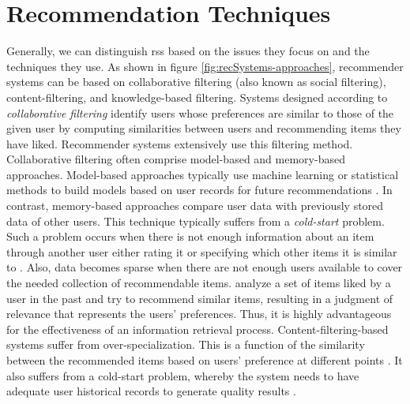\section{Recommendation Techniques}
Generally, we can distinguish \Glspl{rs}  based on the issues they focus on and the techniques they use. As shown in figure \ref{fig:recSystems-approaches}, recommender systems can be based on collaborative filtering (also known as social filtering), content-filtering, and knowledge-based filtering.
Systems designed according to \textit{collaborative filtering} identify users whose preferences are similar to those of the given user by computing similarities between users and recommending items they have liked\parencite{Balabanovic1997Content-BasedRecommendation}. Recommender systems extensively use this filtering method. Collaborative filtering often comprise model-based and memory-based approaches. Model-based approaches typically use machine learning or statistical methods to build models based on user records for future recommendations \parencite{Chu2012DoesImages}. In contrast, memory-based approaches compare user data with previously stored data of other users\parencite{Schiaffino2006PoliteAgents}. This technique typically suffers from a \textit{cold-start} problem. Such a problem occurs when there is not enough information about an item through another user 
either rating it or specifying which other items it is similar to \parencite{Balabanovic1997Content-BasedRecommendation}. Also, data becomes sparse when there are not enough users available to cover the needed collection of recommendable items.
\parencite{Gao2015Content-awareNetworks, Lian2015Content-AwareData} analyze a set of items liked by a user in the past and try to recommend similar items, resulting in a judgment of relevance that represents the users' preferences. Thus, it is highly advantageous for the effectiveness of an information retrieval process. Content-filtering-based systems suffer from over-specialization. This is a function of the similarity between the recommended items based on users' preference at different points \parencite{Lops2011Content-basedTrends}. It also suffers from a cold-start problem, whereby the system needs to have adequate user historical records to generate quality results \parencite{Burke2002HybridInteraction}. 

